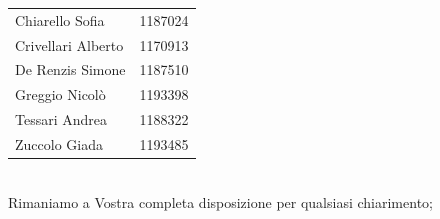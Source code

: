 \documentclass[10pt,stdletter,dateno,sigright]{newlfm}  %
\begin{document}
\begin{newlfm}
\begin{center}
\begin{tabular}{l|l}
    Chiarello Sofia & 1187024 	
    \tabularnewline	
    Crivellari Alberto & 1170913
    \tabularnewline
    De Renzis Simone & 1187510
    \tabularnewline
    Greggio Nicolò & 1193398
    \tabularnewline
    Tessari Andrea & 1188322
    \tabularnewline
    Zuccolo Giada & 1193485
    \tabularnewline
 
\end{tabular}
\end{center}
 \ \newline
  \\Rimaniamo a Vostra completa disposizione per qualsiasi chiarimento;

\end{newlfm}
\end{document}
